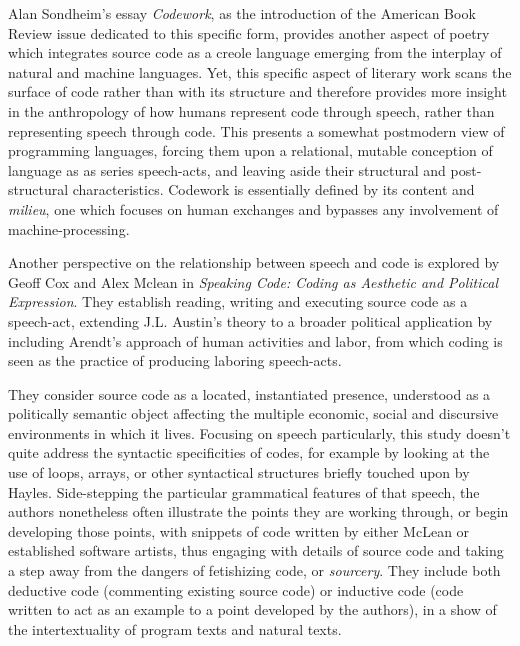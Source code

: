Alan Sondheim's essay \emph{Codework}\cite{sondheim_introduction_2001}, as the introduction of the American Book Review issue dedicated to this specific form, provides another aspect of poetry which integrates source code as a creole language emerging from the interplay of natural and machine languages. Yet, this specific aspect of literary work scans the surface of code rather than with its structure and therefore provides more insight in the anthropology of how humans represent code through speech, rather than representing speech through code. This presents a somewhat postmodern view of programming languages, forcing them upon a relational, mutable conception of language as as series speech-acts, and leaving aside their structural and post-structural characteristics. Codework is essentially defined by its content and \emph{milieu}, one which focuses on human exchanges and bypasses any involvement of machine-processing.

Another perspective on the relationship between speech and code is explored by Geoff Cox and Alex Mclean in \emph{Speaking Code: Coding as Aesthetic and Political Expression}\cite{cox_speaking_2013}. They establish reading, writing and executing source code as a speech-act, extending J.L. Austin's theory to a broader political application by including Arendt's approach of human activities and labor\cite{arendt_human_1998}, from which coding is seen as the practice of producing laboring speech-acts.

They consider source code as a located, instantiated presence, understood as a politically semantic object affecting the multiple economic, social and discursive environments in which it lives. Focusing on speech particularly, this study doesn't quite address the syntactic specificities of codes, for example by looking at the use of loops, arrays, or other syntactical structures briefly touched upon by Hayles. Side-stepping the particular grammatical features of that speech, the authors nonetheless often illustrate the points they are working through, or begin developing those points, with snippets of code written by either McLean or established software artists, thus engaging with details of source code and taking a step away from the dangers of fetishizing code, or \emph{sourcery}\cite{chun_sourcery_2008}. They include both deductive code (commenting existing source code) or inductive code (code written to act as an example to a point developed by the authors), in a show of the intertextuality of program texts and natural texts.

